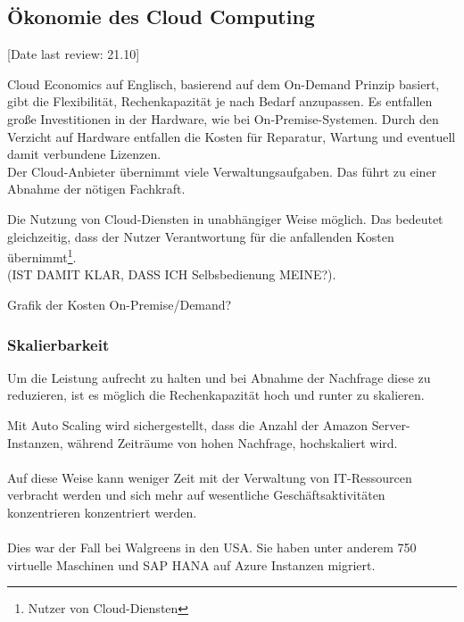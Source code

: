 \subsection{Ökonomie des Cloud Computing}\label{subsec_UabsGrund3}
[Date last review: 21.10]
\begin{flushleft}
      {
            Cloud Economics auf Englisch, basierend auf dem On-Demand Prinzip basiert,
            gibt die Flexibilität, Rechenkapazität je nach Bedarf anzupassen.
            Es entfallen große Investitionen in der Hardware, wie bei On-Premise-Systemen.
            Durch den Verzicht auf Hardware entfallen die Kosten für Reparatur, Wartung und eventuell damit verbundene Lizenzen. 
            \\
            Der Cloud-Anbieter übernimmt viele Verwaltungsaufgaben. Das führt zu einer Abnahme der nötigen Fachkraft.
            {\cite{IDC01}}


           Die Nutzung von Cloud-Diensten in unabhängiger Weise möglich. 
           Das bedeutet gleichzeitig, dass der Nutzer Verantwortung für die anfallenden Kosten übernimmt\footnote{Nutzer von Cloud-Diensten}.
           \\(IST DAMIT KLAR, DASS ICH Selbsbedienung MEINE?). }
\end{flushleft}

Grafik der Kosten On-Premise/Demand?

\subsubsection{Skalierbarkeit}
Um die Leistung aufrecht zu halten und bei Abnahme der Nachfrage diese zu reduzieren,  ist es möglich die Rechenkapazität hoch und runter zu skalieren.

Mit Auto Scaling wird sichergestellt, dass die Anzahl der Amazon Server-Instanzen, während Zeiträume von hohen Nachfrage, hochskaliert wird.
\\\\
Auf diese Weise kann weniger Zeit mit der Verwaltung von IT-Ressourcen verbracht werden und sich mehr auf wesentliche Geschäftsaktivitäten konzentrieren konzentriert werden.
\\\\
Dies war der Fall bei Walgreens in den USA.
Sie haben unter anderem 750 virtuelle Maschinen und SAP HANA auf Azure Instanzen migriert.

